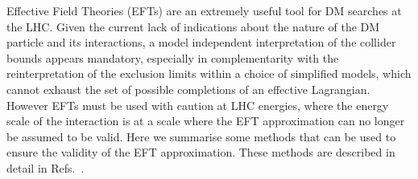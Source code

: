 




%

\def\Qtr{Q_{\rm tr}}
\def\pT{p_{\rm T}}
\def\mx{m_{\rm DM}}
\def\gx{g_{\rm DM}}

 \def\be   {\begin{equation}}   \def\ee   {\end{equation}}
 \def\ba   {\begin{array}}      \def\ea   {\end{array}}
 \def\bea  {\begin{eqnarray}}   \def\eea  {\end{eqnarray}}
 \def\bean {\begin{eqnarray*}}  \def\eean {\end{eqnarray*}}
 \def\nn{\nonumber}




% 



Effective Field Theories (EFTs) are an extremely useful tool for DM searches at the LHC. Given the current lack of indications about the nature of the DM particle and its interactions, a model independent interpretation of the collider bounds appears mandatory, especially in complementarity with the reinterpretation of the exclusion limits within a choice of simplified models, which cannot exhaust the set of possible completions of an effective Lagrangian. However EFTs must be used with caution at LHC energies, where the energy scale of the interaction is at a scale where the EFT approximation can no longer be assumed to be valid. Here we summarise some methods that can be used to ensure the validity of the EFT approximation. These methods are described in detail in Refs.~\cite{Busoni:2013lha,Busoni:2014sya,Busoni:2014haa,Aad:2015zva,Racco:2015dxa}.


